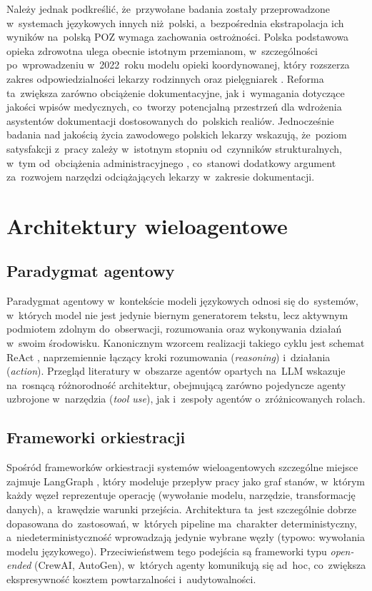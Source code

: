 Należy jednak podkreślić, że~przywołane badania zostały przeprowadzone
w~systemach językowych innych niż~polski, a~bezpośrednia ekstrapolacja
ich wyników na~polską POZ wymaga zachowania ostrożności. Polska
podstawowa opieka zdrowotna ulega obecnie istotnym przemianom,
w~szczególności po~wprowadzeniu w~2022~roku modelu opieki
koordynowanej, który rozszerza zakres odpowiedzialności lekarzy
rodzinnych oraz pielęgniarek \parencite{coordinatedcarepoland}.
Reforma ta~zwiększa zarówno obciążenie dokumentacyjne, jak
i~wymagania dotyczące jakości wpisów medycznych, co~tworzy
potencjalną przestrzeń dla wdrożenia asystentów dokumentacji
dostosowanych do~polskich realiów. Jednocześnie badania nad
jakością życia zawodowego polskich lekarzy wskazują, że~poziom
satysfakcji z~pracy zależy w~istotnym stopniu od~czynników
strukturalnych, w~tym od~obciążenia administracyjnego
\parencite{workqualitypolishphysicians}, co~stanowi dodatkowy
argument za~rozwojem narzędzi odciążających lekarzy w~zakresie
dokumentacji.

\section{Architektury wieloagentowe}\label{sec:multi-agent}

\subsection{Paradygmat agentowy}

Paradygmat agentowy w~kontekście modeli językowych odnosi się
do~systemów, w~których model nie jest jedynie biernym generatorem
tekstu, lecz aktywnym podmiotem zdolnym do~obserwacji, rozumowania
oraz wykonywania działań w~swoim środowisku. Kanonicznym wzorcem
realizacji takiego cyklu jest schemat ReAct \parencite{yao2023react},
naprzemiennie łączący kroki rozumowania (\emph{reasoning})
i~działania (\emph{action}). Przegląd literatury w~obszarze agentów
opartych na~LLM \parencite{xi2023agents} wskazuje na~rosnącą
różnorodność architektur, obejmującą zarówno pojedyncze agenty
uzbrojone w~narzędzia (\emph{tool use}), jak i~zespoły agentów
o~zróżnicowanych rolach.

\subsection{Frameworki orkiestracji}

Spośród frameworków orkiestracji systemów wieloagentowych szczególne
miejsce zajmuje LangGraph \parencite{langgraph2024}, który modeluje
przepływ pracy jako graf stanów, w~którym każdy węzeł reprezentuje
operację (wywołanie modelu, narzędzie, transformację danych),
a~krawędzie warunki przejścia. Architektura ta~jest szczególnie
dobrze dopasowana do~zastosowań, w~których pipeline ma~charakter
deterministyczny, a~niedeterministyczność wprowadzają jedynie wybrane
węzły (typowo: wywołania modelu językowego). Przeciwieństwem tego
podejścia są frameworki typu \emph{open-ended} (CrewAI, AutoGen),
w~których agenty komunikują się ad~hoc, co~zwiększa ekspresywność
kosztem powtarzalności i~audytowalności.

